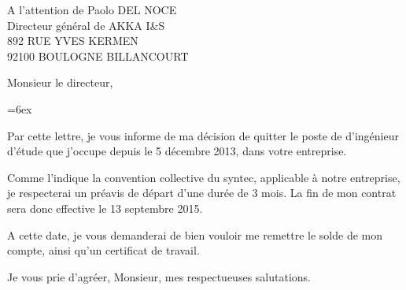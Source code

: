 \documentclass[10pt,a4paper]{lettre}
\begin{document}
\begin{letter}{A l'attention de Paolo DEL NOCE\\Directeur général de AKKA I&S\\892 RUE YVES KERMEN\\92100 BOULOGNE BILLANCOURT}
\address{Victor Cameo Ponz\\16 rue Peyras\\31000 Toulouse}
\nofax

\opening{Monsieur le directeur,}

\parindent=6ex

Par cette lettre, je vous informe de ma décision de quitter le poste de d'ingénieur d'étude que j’occupe depuis le 5 décembre 2013, dans votre entreprise.

Comme l’indique la convention collective du syntec, applicable à notre entreprise, je respecterai un préavis de départ d’une durée de 3 mois.
La fin de mon contrat sera donc effective le 13 septembre 2015.

A cette date, je vous demanderai de bien vouloir me remettre le solde de mon compte, ainsi qu’un certificat de travail. 

\closing{Je vous prie d’agréer, Monsieur, mes respectueuses salutations.}
\end{letter}
\end{document}
